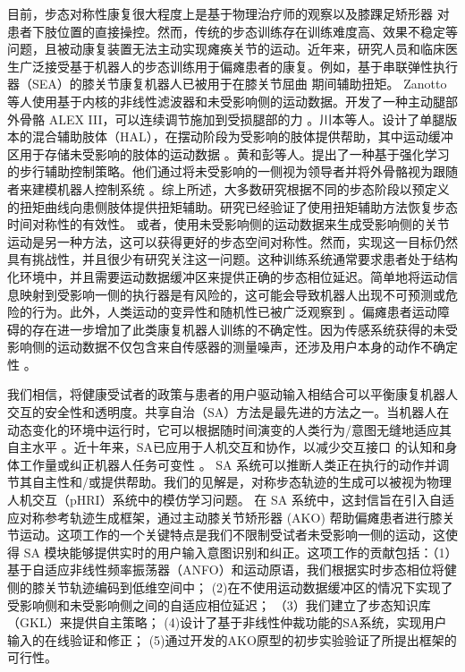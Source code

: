 目前，步态对称性康复很大程度上是基于物理治疗师的观察以及膝踝足矫形器   \cite{abeNarrativeReviewAlternate2021}   对患者下肢位置的直接操控。然而，传统的步态训练存在训练难度高、效果不稳定等问题，且被动康复装置无法主动实现瘫痪关节的运动。近年来，研究人员和临床医生广泛接受基于机器人的步态训练用于偏瘫患者的康复。例如，基于串联弹性执行器（SEA）的膝关节康复机器人已被用于在膝关节屈曲    \cite{sulzerHighlyBackdrivableLightweight2009,zhongGaitSymmetryEnhancement2022}    期间辅助扭矩。 Zanotto 等人使用基于内核的非线性滤波器和未受影响侧的运动数据。开发了一种主动腿部外骨骼 ALEX III，可以连续调节施加到受损腿部的力    \cite{zanottoAdaptiveAssistasneededController2014a}   。川本等人。设计了单腿版本的混合辅助肢体（HAL），在摆动阶段为受影响的肢体提供帮助，其中运动缓冲区用于存储未受影响的肢体的运动数据    \cite{kawamotoDevelopmentAssistController2014a,kawamotoModificationHemiplegicCompensatory2015}    。黄和彭等人。提出了一种基于强化学习的步行辅助控制策略。他们通过将未受影响的一侧视为领导者并将外骨骼视为跟随者来建模机器人控制系统    \cite{huangLearningbasedWalkingAssistance2018,pengDataDrivenReinforcementLearning2020}    。综上所述，大多数研究根据不同的步态阶段以预定义的扭矩曲线向患侧肢体提供扭矩辅助。研究已经验证了使用扭矩辅助方法恢复步态时间对称性的有效性。
或者，使用未受影响侧的运动数据来生成受影响侧的关节运动是另一种方法，这可以获得更好的步态空间对称性。然而，实现这一目标仍然具有挑战性，并且很少有研究关注这一问题。这种训练系统通常要求患者处于结构化环境中，并且需要运动数据缓冲区来提供正确的步态相位延迟。简单地将运动信息映射到受影响一侧的执行器是有风险的，这可能会导致机器人出现不可预测或危险的行为。此外，人类运动的变异性和随机性已被广泛观察到    \cite{vanbeersRoleExecutionNoise2004}    。偏瘫患者运动障碍的存在进一步增加了此类康复机器人训练的不确定性。因为传感系统获得的未受影响侧的运动数据不仅包含来自传感器的测量噪声，还涉及用户本身的动作不确定性    \cite{gopinathCustomizedHandlingUnintended2021}。  

我们相信，将健康受试者的政策与患者的用户驱动输入相结合可以平衡康复机器人交互的安全性和透明度。共享自治（SA）方法是最先进的方法之一。当机器人在动态变化的环境中运行时，它可以根据随时间演变的人类行为/意图无缝地适应其自主水平    \cite{selvaggioAutonomyPhysicalHumanRobot2021a}    。近十年来，SA已应用于人机交互和协作，以减少交互接口   \cite{dingHumanintheloopOptimizationHip2018}   的认知和身体工作量或纠正机器人任务可变性   \cite{hagenowCorrectiveSharedAutonomy2021}   。 SA 系统可以推断人类正在执行的动作并调节其自主性和/或提供帮助。我们的见解是，对称步态轨迹的生成可以被视为物理人机交互（pHRI）系统中的模仿学习问题。
在 SA 系统中，这封信旨在引入自适应对称参考轨迹生成框架，通过主动膝关节矫形器 (AKO) 帮助偏瘫患者进行膝关节运动。这项工作的一个关键特点是我们不限制受试者未受影响一侧的运动，这使得 SA 模块能够提供实时的用户输入意图识别和纠正。这项工作的贡献包括：（1）基于自适应非线性频率振荡器（ANFO）和运动原语，我们根据实时步态相位将健侧的膝关节轨迹编码到低维空间中； (2)在不使用运动数据缓冲区的情况下实现了受影响侧和未受影响侧之间的自适应相位延迟； （3）我们建立了步态知识库（GKL）来提供自主策略； (4)设计了基于非线性仲裁功能的SA系统，实现用户输入的在线验证和修正； (5)通过开发的AKO原型的初步实验验证了所提出框架的可行性。

